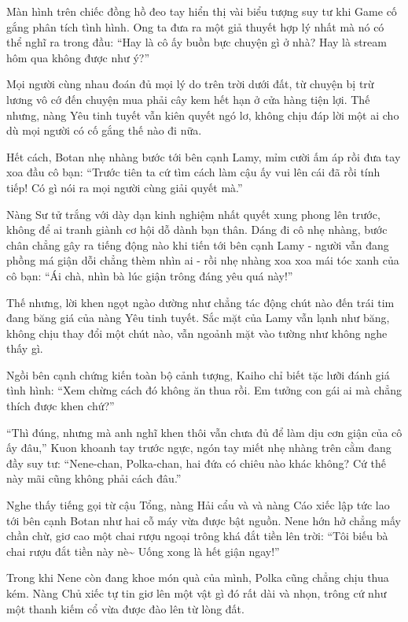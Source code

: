 \documentclass[../main.tex]{subfiles}
\begin{document}
Màn hình trên chiếc đồng hồ đeo tay hiển thị vài biểu tượng suy tư khi Game cố gắng phân tích tình hình. Ong ta đưa ra một giả thuyết hợp lý nhất mà nó có thể nghĩ ra trong đầu: ``Hay là cô ấy buồn bực chuyện gì ở nhà? Hay là stream hôm qua không được như ý?''

Mọi người cùng nhau đoán đủ mọi lý do trên trời dưới đất, từ chuyện bị trừ lương vô cớ đến chuyện mua phải cây kem hết hạn ở cửa hàng tiện lợi. Thế nhưng, nàng Yêu tinh tuyết vẫn kiên quyết ngó lơ, không chịu đáp lời một ai cho dù mọi người có cố gắng thế nào đi nữa.

Hết cách, Botan nhẹ nhàng bước tới bên cạnh Lamy, mỉm cười ấm áp rồi đưa tay xoa đầu cô bạn: ``Trước tiên ta cứ tìm cách làm cậu ấy vui lên cái đã rồi tính tiếp! Có gì nói ra mọi người cùng giải quyết mà.''

\ct

Nàng Sư tử trắng với dày dạn kinh nghiệm nhất quyết xung phong lên trước, không để ai tranh giành cơ hội dỗ dành bạn thân. Dáng đi cô nhẹ nhàng, bước chân chẳng gây ra tiếng động nào khi tiến tới bên cạnh Lamy - người vẫn đang phồng má giận dỗi chẳng thèm nhìn ai - rồi nhẹ nhàng xoa xoa mái tóc xanh của cô bạn: ``Ái chà, nhìn bà lúc giận trông đáng yêu quá này!''

Thế nhưng, lời khen ngọt ngào dường như chẳng tác động chút nào đến trái tim đang băng giá của nàng Yêu tinh tuyết. Sắc mặt của Lamy vẫn lạnh như băng, không chịu thay đổi một chút nào, vẫn ngoảnh mặt vào tường như không nghe thấy gì.

Ngồi bên cạnh chứng kiến toàn bộ cảnh tượng, Kaiho chỉ biết tặc lưỡi đánh giá tình hình: ``Xem chừng cách đó không ăn thua rồi. Em tưởng con gái ai mà chẳng thích được khen chứ?''

``Thì đúng, nhưng mà anh nghĩ khen thôi vẫn chưa đủ để làm dịu cơn giận của cô ấy đâu,'' Kuon khoanh tay trước ngực, ngón tay miết nhẹ nhàng trên cằm đang đầy suy tư: ``Nene-chan, Polka-chan, hai đứa có chiêu nào khác không? Cứ thế này mãi cũng không phải cách đâu.''

Nghe thấy tiếng gọi từ cậu Tổng, nàng Hải cẩu và và nàng Cáo xiếc lập tức lao tới bên cạnh Botan như hai cỗ máy vừa được bật nguồn. Nene hớn hở chẳng mấy chần chừ, giơ cao một chai rượu ngoại trông khá đắt tiền lên trời: ``Tôi biếu bà chai rượu đắt tiền này nè\~{} Uống xong là hết giận ngay!''

Trong khi Nene còn đang khoe món quà của mình, Polka cũng chẳng chịu thua kém. Nàng Chủ xiếc tự tin giơ lên một vật gì đó rất dài và nhọn, trông cứ như một thanh kiếm cổ vừa được đào lên từ lòng đất.
\end{document}

